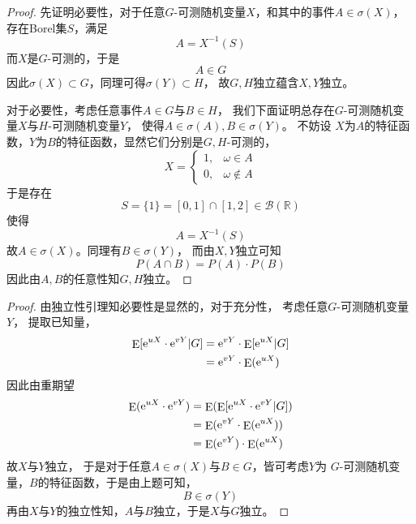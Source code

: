 \documentclass[cn]{homework}
\DeclareMathOperator{\E}{E}
\begin{document}
    \problem
    \begin{subproblem}
        \item
        \begin{proof}
            先证明必要性，对于任意$G$-可测随机变量$X$，和其中的事件$A\in\sigma(X)$，
            存在Borel集$S$，满足
            \[A=X^{-1}(S)\]
            而$X$是$G$-可测的，于是
            \[A\in G\]
            因此$\sigma(X)\subset G$，同理可得$\sigma(Y)\subset H$，
            故$G,H$独立蕴含$X,Y$独立。

            对于必要性，考虑任意事件$A\in G$与$B\in H$，
            我们下面证明总存在$G$-可测随机变量$X$与$H$-可测随机变量$Y$，
            使得$A\in\sigma(A),B\in\sigma(Y)$。
            不妨设
            $X$为$A$的特征函数，$Y$为$B$的特征函数，显然它们分别是$G,H$-可测的，
            \[X=\begin{cases}
                1,&\omega\in A\\
                0,&\omega\not\in A
            \end{cases}\]
            于是存在
            \[S=\{1\}=[0,1]\cap[1,2]\in\mathcal B(\mathbb R)\]
            使得
            \[A=X^{-1}(S)\]
            故$A\in\sigma(X)$。同理有$B\in\sigma(Y)$，
            而由$X,Y$独立可知
            \[P(A\cap B)=P(A)\cdot P(B)\]
            因此由$A,B$的任意性知$G,H$独立。
        \end{proof}

        \item
        \begin{proof}
            由独立性引理知必要性是显然的，对于充分性，
            考虑任意$G$-可测随机变量$Y$，
            提取已知量，
            \[\begin{aligned}
                \E[\e^{uX}\cdot\e^{vY}|G]&=\e^{vY}\cdot\E[\e^{uX}|G]\\
                &=\e^{vY}\cdot\E(\e^{uX})
            \end{aligned}\]
            因此由重期望
            \[\begin{aligned}
                \E(\e^{uX}\cdot\e^{vY})&=\E(\E[\e^{uX}\cdot\e^{vY}|G])\\
                &=\E(\e^{vY}\cdot\E(\e^{uX}))\\
                &=\E(\e^{vY})\cdot\E(\e^{uX})
            \end{aligned}\]
            故$X$与$Y$独立，
            于是对于任意$A\in\sigma(X)$与$B\in G$，皆可考虑$Y$为
            $G$-可测随机变量，$B$的特征函数，于是由上题可知，
            \[B\in\sigma(Y)\]
            再由$X$与$Y$的独立性知，$A$与$B$独立，于是$X$与$G$独立。
        \end{proof}
    \end{subproblem}
\end{document}
